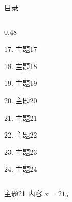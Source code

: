 \documentclass[aspectratio=169,10pt,fontset=fandol]{ctexbeamer}
\begin{document}
\begin{frame}[t,fragile]{目录}
\begin{columns}[T,onlytextwidth]
\begin{column}{0.48\textwidth}
{\color{black}\small 17. 主题17\par}\vspace{0.22em}
{\color{black}\small 18. 主题18\par}\vspace{0.22em}
{\color{black}\small 19. 主题19\par}\vspace{0.22em}
{\color{black}\small 20. 主题20\par}\vspace{0.22em}
{\color{blue}\small 21. 主题21\par}\vspace{0.22em}
{\color{gray!40}\small 22. 主题22\par}\vspace{0.22em}
{\color{gray!40}\small 23. 主题23\par}\vspace{0.22em}
{\color{gray!40}\small 24. 主题24\par}\vspace{0.22em}
\end{column}
\end{columns}
\end{frame}
\begin{frame}[t,fragile]{主题21}
\normalsize
{\normalsize
内容 $x=21$。
}
\end{frame}
\end{document}
